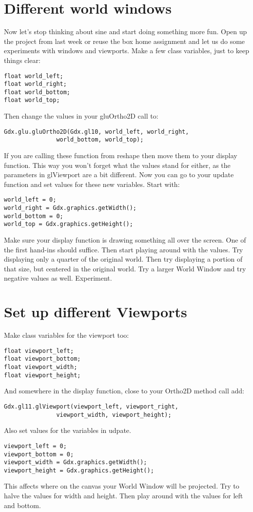 \documentclass[11pt,a4paper]{article}
\begin{document}
\section{Different world windows}
Now let's stop thinking about sine and start doing something more fun. Open up
the project from last week or reuse the box home assignment and let us do some
experiments with windows and viewports. Make a few class variables, just to
keep things clear:
\begin{lstlisting}
float world_left;
float world_right;
float world_bottom;
float world_top;
\end{lstlisting}
Then change the values in your gluOrtho2D call to:
\begin{lstlisting}
Gdx.glu.gluOrtho2D(Gdx.gl10, world_left, world_right, 
               world_bottom, world_top);
\end{lstlisting}
If you are calling these function from reshape then move them to your display
function. This way you won't forget what the values stand for either, as the
parameters in glViewport are a bit different.  Now you can go to your update
function and set values for these new variables. Start with:

\begin{lstlisting}
world_left = 0;
world_right = Gdx.graphics.getWidth();
world_bottom = 0;
world_top = Gdx.graphics.getHeight();
\end{lstlisting}
Make sure your display function is drawing something all over the screen. One
of the first hand-ins should suffice. Then start playing around with the
values. Try displaying only a quarter of the original world. Then try
displaying a portion of that size, but centered in the original world. Try a
larger World Window and try negative values as well. Experiment.  


\section{Set up different Viewports}
Make class variables for the viewport too:
\begin{lstlisting}
float viewport_left;
float viewport_bottom;
float viewport_width;
float viewport_height;
\end{lstlisting}
And somewhere in the display function, close to your Ortho2D method call add:
\begin{lstlisting}
Gdx.gl11.glViewport(viewport_left, viewport_right, 
               viewport_width, viewport_height);
\end{lstlisting}
Also set values for the variables in udpate.
\begin{lstlisting}
viewport_left = 0;
viewport_bottom = 0;
viewport_width = Gdx.graphics.getWidth(); 
viewport_height = Gdx.graphics.getHeight();
\end{lstlisting}
This affects where on the canvas your World Window will be projected. Try to
halve the values for width and height. Then play around with the values for
left and bottom.
\end{document}
